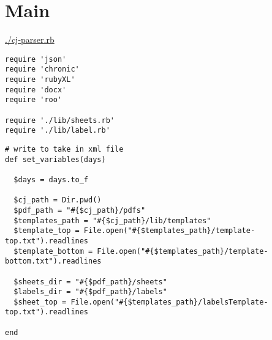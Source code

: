 \documentclass[11pt]{article}
\begin{document}
\section{Main}
\label{sec-4}

\url{./cj-parser.rb}

\begin{verbatim}
require 'json'
require 'chronic'
require 'rubyXL'
require 'docx'
require 'roo'

require './lib/sheets.rb'
require './lib/label.rb'
\end{verbatim}

\begin{verbatim}
# write to take in xml file
def set_variables(days)

  $days = days.to_f

  $cj_path = Dir.pwd()
  $pdf_path = "#{$cj_path}/pdfs"
  $templates_path = "#{$cj_path}/lib/templates"
  $template_top = File.open("#{$templates_path}/template-top.txt").readlines
  $template_bottom = File.open("#{$templates_path}/template-bottom.txt").readlines

  $sheets_dir = "#{$pdf_path}/sheets"
  $labels_dir = "#{$pdf_path}/labels"
  $sheet_top = File.open("#{$templates_path}/labelsTemplate-top.txt").readlines

end
\end{verbatim}
\end{document}
